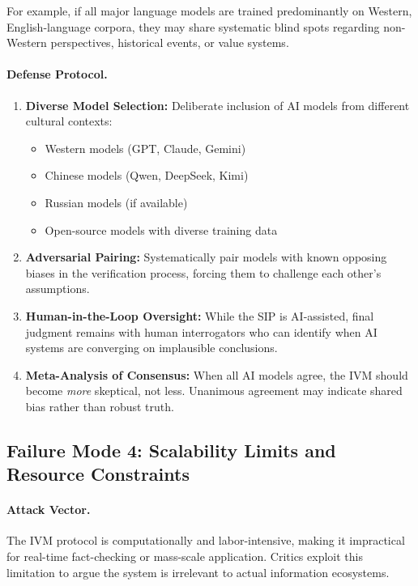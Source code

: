 \documentclass[11pt,a4paper]{article}
\begin{document}
For example, if all major language models are trained predominantly on Western, English-language corpora, they may share systematic blind spots regarding non-Western perspectives, historical events, or value systems.

\paragraph{Defense Protocol.}

\begin{enumerate}
    \item \textbf{Diverse Model Selection:} Deliberate inclusion of AI models from different cultural contexts:
    \begin{itemize}
        \item Western models (GPT, Claude, Gemini)
        \item Chinese models (Qwen, DeepSeek, Kimi)
        \item Russian models (if available)
        \item Open-source models with diverse training data
    \end{itemize}
    
    \item \textbf{Adversarial Pairing:} Systematically pair models with known opposing biases in the verification process, forcing them to challenge each other's assumptions.
    
    \item \textbf{Human-in-the-Loop Oversight:} While the SIP is AI-assisted, final judgment remains with human interrogators who can identify when AI systems are converging on implausible conclusions.
    
    \item \textbf{Meta-Analysis of Consensus:} When all AI models agree, the IVM should become \textit{more} skeptical, not less. Unanimous agreement may indicate shared bias rather than robust truth.
\end{enumerate}

\subsection{Failure Mode 4: Scalability Limits and Resource Constraints}

\paragraph{Attack Vector.} The IVM protocol is computationally and labor-intensive, making it impractical for real-time fact-checking or mass-scale application. Critics exploit this limitation to argue the system is irrelevant to actual information ecosystems.
\end{document}
